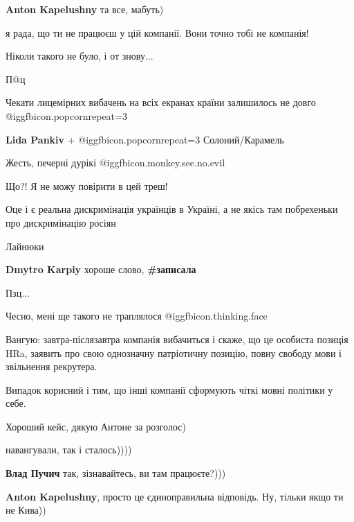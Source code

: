 \begin{itemize}
\begin{itemize}
\textbf{Anton Kapelushny} та все, мабуть)
\end{itemize} %

я рада, що ти не працюєш у цій компанії. Вони точно тобі не компанія!

Ніколи такого не було, і от знову...


П@ц

Чекати лицемірних вибачень на всіх екранах країни залишилось не довго @igg{fbicon.popcorn}{repeat=3} 

\begin{itemize} %
\textbf{Lida Pankiv} +  @igg{fbicon.popcorn}{repeat=3}  Солоний/Карамель
\end{itemize} %

Жесть, печерні дурікі  @igg{fbicon.monkey.see.no.evil} 

Що?! Я не можу повірити в цей треш!

Оце і є реальна дискримінація українців в Україні, а не якісь там побрехеньки про дискримінацію росіян

Лайнюки

\begin{itemize} %
\textbf{Dmytro Karpiy} хороше слово, \textbf{\#записала}
\end{itemize} %

Пзц...

Чесно, мені ще такого не траплялося  @igg{fbicon.thinking.face} 


Вангую: завтра-післязавтра компанія вибачиться і скаже, що це особиста позиція
HRa, заявить про свою однозначну патріотичну позицію, повну свободу мови і
звільнення рекрутера.

Випадок корисний і тим, що інші компанії сформують чіткі мовні політики у себе.

Хороший кейс, дякую Антоне за розголос)

\begin{itemize} %
навангували, так і сталось))))

\textbf{Влад Пучич} так, зізнавайтесь, ви там працюєте?)))

\textbf{Anton Kapelushny}, просто це єдиноправильна відповідь. Ну, тільки якщо ти не Кива))


\end{itemize}
\end{itemize}
